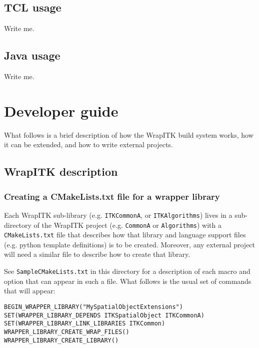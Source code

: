 \documentclass{InsightArticle}
\begin{document}
    \subsection{TCL usage}

Write me.

    \subsection{Java usage}

Write me.

\section{Developer guide}

What follows is a brief description of how the WrapITK build system works, how
it can be extended, and how to write external projects.

  \subsection{WrapITK description}

     \subsubsection{Creating a CMakeLists.txt file for a wrapper library}
Each WrapITK sub-library (e.g. \verb$ITKCommonA$, or \verb$ITKAlgorithms$) lives in a
sub-directory of the WrapITK project (e.g. \verb$CommonA$ or \verb$Algorithms$) with a
\verb$CMakeLists.txt$ file that describes how that library  and language support files
(e.g. python template definitions) is to be created. Moreover, any external
project will need a similar file to describe how to create that library.

See \verb$SampleCMakeLists.txt$ in this directory for a description of each macro and
option that can appear in such a file. What follows is the usual set of commands
that will appear:

\small \begin{verbatim}
BEGIN_WRAPPER_LIBRARY("MySpatialObjectExtensions")
SET(WRAPPER_LIBRARY_DEPENDS ITKSpatialObject ITKCommonA)
SET(WRAPPER_LIBRARY_LINK_LIBRARIES ITKCommon)
WRAPPER_LIBRARY_CREATE_WRAP_FILES()
WRAPPER_LIBRARY_CREATE_LIBRARY()
\end{verbatim} \normalsize
\end{document}
